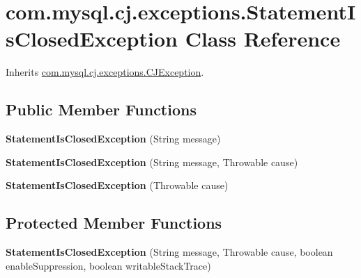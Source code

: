 \hypertarget{classcom_1_1mysql_1_1cj_1_1exceptions_1_1_statement_is_closed_exception}{}\section{com.\+mysql.\+cj.\+exceptions.\+Statement\+Is\+Closed\+Exception Class Reference}
\label{classcom_1_1mysql_1_1cj_1_1exceptions_1_1_statement_is_closed_exception}


Inherits \mbox{\hyperlink{classcom_1_1mysql_1_1cj_1_1exceptions_1_1_c_j_exception}{com.\+mysql.\+cj.\+exceptions.\+C\+J\+Exception}}.

\subsection*{Public Member Functions}
\begin{DoxyCompactItemize}
\item 
\mbox{\label{classcom_1_1mysql_1_1cj_1_1exceptions_1_1_statement_is_closed_exception_aec621d0f4086aae481d94aeb65e15542}} 
{\bfseries Statement\+Is\+Closed\+Exception} (String message)
\item 
\mbox{\label{classcom_1_1mysql_1_1cj_1_1exceptions_1_1_statement_is_closed_exception_af17a0f30ac98573ee7a585b9559f470c}} 
{\bfseries Statement\+Is\+Closed\+Exception} (String message, Throwable cause)
\item 
\mbox{\label{classcom_1_1mysql_1_1cj_1_1exceptions_1_1_statement_is_closed_exception_a771e6b5138118f421dc2cbafbbb614b9}} 
{\bfseries Statement\+Is\+Closed\+Exception} (Throwable cause)
\end{DoxyCompactItemize}
\subsection*{Protected Member Functions}
\begin{DoxyCompactItemize}
\item 
\mbox{\label{classcom_1_1mysql_1_1cj_1_1exceptions_1_1_statement_is_closed_exception_adef6f9b2bccc5d42ad620d9e5e2e2ed0}} 
{\bfseries Statement\+Is\+Closed\+Exception} (String message, Throwable cause, boolean enable\+Suppression, boolean writable\+Stack\+Trace)
\end{DoxyCompactItemize}
